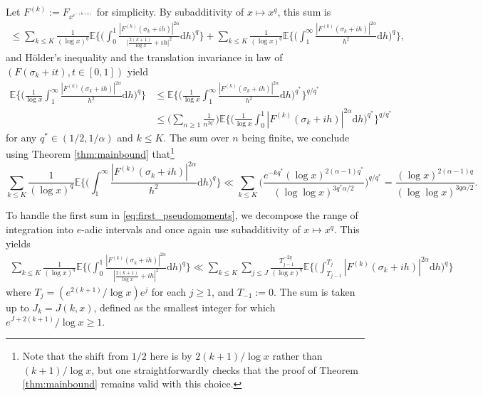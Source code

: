 \documentclass{amsart}
\theoremstyle{definition}
\theoremstyle{remark}
\numberwithin{equation}{section}
\begin{document}
Let $F^{(k)}:= F_{x^{e^{-(k+1)}}}$ for simplicity. By subadditivity of $x\mapsto x^q$, this sum is
\begin{align}\label{eq:first_pseudomoments}
    \leq \sum_{k\leq K}\frac{1}{(\log x)^q}\mathbb{E}\bigg\{\bigg(\int_{0}^1\frac{|F^{(k)}(\sigma_k+ih)|^{2\alpha}}{\big|\tfrac{2(k+1)}{\log x}+ih\big|^{2}}\mathrm{d}h\bigg)^q\bigg\} +  \sum_{k\leq K}\frac{1}{(\log x)^q}\mathbb{E}\bigg\{\bigg(\int_{1}^\infty{\frac{|F^{(k)}(\sigma_k+ih)|^{2\alpha}}{h^2}}\mathrm{d}h\bigg)^q\bigg\},
\end{align}
and Hölder's inequality and the translation invariance in law of $(F(\sigma_k+it), t\in [0,1])$ yield
\begin{align*}
    \mathbb{E}\bigg\{\bigg(\frac{1}{\log x}\int_{1}^\infty{\frac{|F^{(k)}(\sigma_k+ih)|^{2\alpha}}{h^2}}\mathrm{d}h\bigg)^{q}\bigg\} &\leq \mathbb{E}\bigg\{\bigg(\frac{1}{\log x}\int_{1}^\infty{\frac{|F^{(k)}(\sigma_k+ih)|^{2\alpha}}{h^2}}\mathrm{d}h\bigg)^{q^*}\bigg\}^{q/q^*}\\&\leq \bigg(\sum_{n\geq 1} \frac{1}{n^{2q^*}}\bigg)\mathbb{E}\bigg\{\bigg(\frac{1}{\log x}\int_{0}^1{{|F^{(k)}(\sigma_k+ih)|^{2\alpha}}}\mathrm{d}h\bigg)^{q^*}\bigg\}^{q/q^*}
\end{align*}
for any $q^*\in (1/2,1/\alpha)$ and $k\leq K$. The sum over $n$ being finite, we conclude using Theorem \ref{thm:mainbound} that\footnote{Note that the shift from $1/2$ here is by $2(k+1)/\log x$ rather than $(k+1)/\log x$, but one straightforwardly checks that the proof of Theorem \ref{thm:mainbound} remains valid with this choice.}
\[
    \sum_{k\leq K}\frac{1}{(\log x)^q}\mathbb{E}\bigg\{\bigg(\int_{1}^\infty{\frac{|F^{(k)}(\sigma_k+ih)|^{2\alpha}}{h^2}}\mathrm{d}h\bigg)^q\bigg\}\ll \sum_{k\leq K}\bigg(\frac{e^{-kq^*}(\log x)^{2(\alpha-1)q^*}}{(\log \log x)^{3q^*\alpha/2}}\bigg)^{q/q^*} = \frac{(\log x)^{2(\alpha-1)q}}{(\log \log x)^{3q\alpha/2}}.
\]

To handle the first sum in \eqref{eq:first_pseudomoments}, we decompose the range of integration into $e$-adic intervals and once again use subadditivity of $x\mapsto x^q$. This yields
\begin{align*}
    \sum_{k\leq K}\frac{1}{(\log x)^q}\mathbb{E}\bigg\{\bigg(\int_{0}^1\frac{|F^{(k)}(\sigma_k+ih)|^{2\alpha}}{|\tfrac{2(k+1)}{\log x}+ih|^{2}}\mathrm{d}h\bigg)^q\bigg\} \ll \sum_{k\leq K} \sum_{j\leq J} \frac{T_{j-1}^{-2q}}{(\log x)^q} \mathbb{E}\bigg\{\bigg(\int_{T_{j-1}}^{T_{j}}|F^{(k)}(\sigma_k+ih)|^{2\alpha}\mathrm{d}h\bigg)^q\bigg\}
\end{align*}
where $T_j=(e^{2(k+1)}/\log x)e^{j}$ for each $j\geq 1$, and $T_{-1}:=0$. The sum is taken up to $J_k=J(k,x)$, defined as the smallest integer for which $e^{J+2(k+1)}/\log x\geq 1$. 
\end{document}

